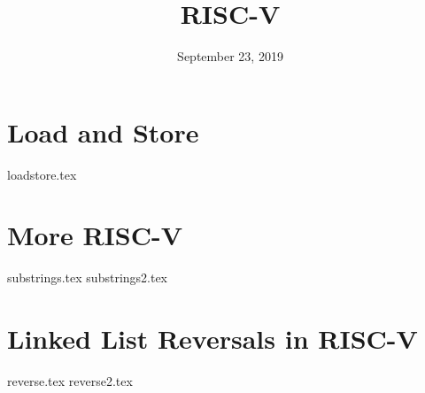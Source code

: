 \documentclass[11pt]{exam}
\title{RISC-V}
\date{September 23, 2019}
\begin{document}
\maketitle

\section{Load and Store}
\begin{questions}
{loadstore.tex}
\end{questions}
\newpage

\section{More RISC-V}
\begin{questions}
{substrings.tex}
{substrings2.tex}
\end{questions}


\section{Linked List Reversals in RISC-V}
\begin{questions}
{reverse.tex}
{reverse2.tex}
\end{questions}
\newpage
\end{document}
